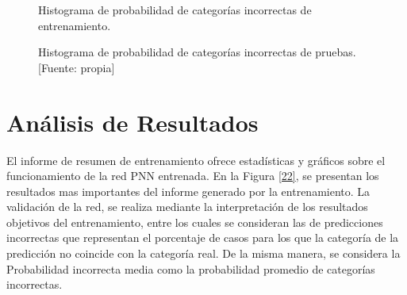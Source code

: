 \documentclass[11pt,titlepage]{report}
\begin{document}
\begin{figure}[h]
	\centering
	\caption{Histograma de probabilidad de categorías incorrectas de entrenamiento.\label{23}}
	\caption{Histograma de probabilidad de categorías incorrectas de pruebas.[Fuente: propia]\label{23}}
\end{figure}


\section{Análisis de Resultados}
El informe de resumen de entrenamiento ofrece estadísticas y gráficos sobre
el funcionamiento de la red PNN entrenada. En la Figura \ref{22}, se presentan los resultados mas importantes del informe generado por la entrenamiento. La validación de la red, se realiza mediante la interpretación de los resultados objetivos del entrenamiento, entre los cuales se consideran las de predicciones incorrectas que representan el porcentaje de casos para los que la categoría de la predicción no coincide con la categoría real. De la misma manera, se considera la Probabilidad incorrecta media como la probabilidad promedio de categorías incorrectas.
\end{document}
